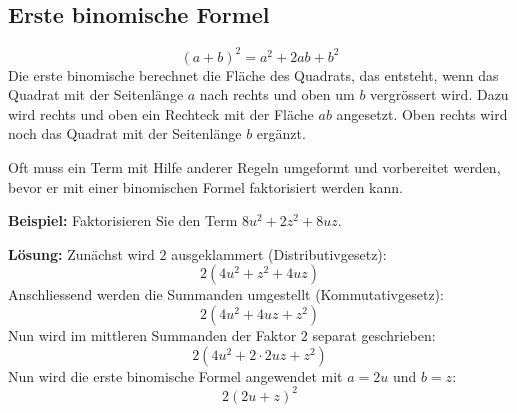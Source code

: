 \subsection{Erste binomische Formel}
\[
  (a+b)^{2} = a^{2} + 2ab + b^{2}
\]
Die erste binomische berechnet die Fläche des Quadrats, das entsteht, wenn das Quadrat mit der Seitenlänge $a$ nach rechts und oben um $b$ vergrössert wird. Dazu wird rechts und oben ein Rechteck mit der Fläche $ab$ angesetzt. Oben rechts wird noch das Quadrat mit der Seitenlänge $b$ ergänzt.
\begin{center}
\end{center}
Oft muss ein Term mit Hilfe anderer Regeln umgeformt und vorbereitet werden, bevor er mit einer binomischen Formel faktorisiert werden kann.
\begin{example}
  \textbf{Beispiel:} Faktorisieren Sie den Term $8u^{2}+2z^{2}+8uz$.

  \textbf{Lösung:} Zunächst wird $2$ ausgeklammert (Distributivgesetz):
  \[
    2\left(4u^{2}+z^{2}+4uz\right)
  \]
  Anschliessend werden die Summanden umgestellt (Kommutativgesetz):
  \[
    2\left(4u^{2}+4uz+z^{2}\right)
  \]
  Nun wird im mittleren Summanden der Faktor $2$ separat geschrieben:
  \[
    2\left(4u^{2}+2\cdot 2uz+z^{2}\right)
  \]
  Nun wird die erste binomische Formel angewendet mit $a=2u$ und $b=z$:
  \[
    2(2u+z)^{2}
  \]
\end{example}

